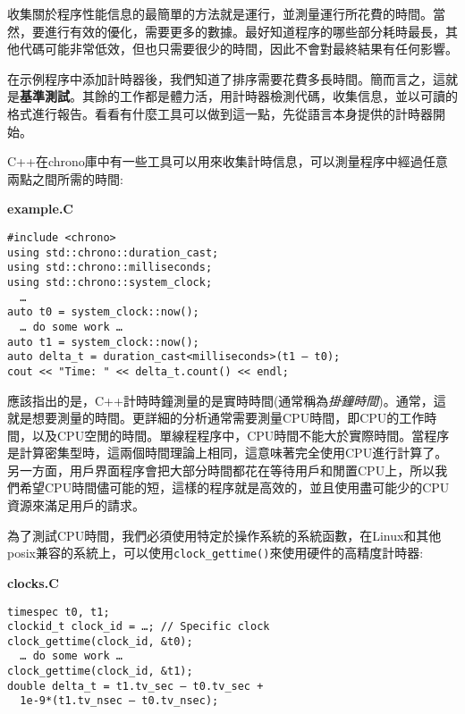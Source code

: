 
收集關於程序性能信息的最簡單的方法就是運行，並測量運行所花費的時間。當然，要進行有效的優化，需要更多的數據。最好知道程序的哪些部分耗時最長，其他代碼可能非常低效，但也只需要很少的時間，因此不會對最終結果有任何影響。

在示例程序中添加計時器後，我們知道了排序需要花費多長時間。簡而言之，這就是\textbf{基準測試}。其餘的工作都是體力活，用計時器檢測代碼，收集信息，並以可讀的格式進行報告。看看有什麼工具可以做到這一點，先從語言本身提供的計時器開始。


C++在chrono庫中有一些工具可以用來收集計時信息，可以測量程序中經過任意兩點之間所需的時間:

\noindent
\textbf{example.C}
\begin{lstlisting}[style=styleCXX]
#include <chrono>
using std::chrono::duration_cast;
using std::chrono::milliseconds;
using std::chrono::system_clock;
  …
auto t0 = system_clock::now();
  … do some work …
auto t1 = system_clock::now();
auto delta_t = duration_cast<milliseconds>(t1 – t0);
cout << "Time: " << delta_t.count() << endl;
\end{lstlisting}

應該指出的是，C++計時時鐘測量的是實時時間(通常稱為\textit{掛鐘時間})。通常，這就是想要測量的時間。更詳細的分析通常需要測量CPU時間，即CPU的工作時間，以及CPU空閒的時間。單線程程序中，CPU時間不能大於實際時間。當程序是計算密集型時，這兩個時間理論上相同，這意味著完全使用CPU進行計算了。另一方面，用戶界面程序會把大部分時間都花在等待用戶和閒置CPU上，所以我們希望CPU時間儘可能的短，這樣的程序就是高效的，並且使用盡可能少的CPU資源來滿足用戶的請求。



為了測試CPU時間，我們必須使用特定於操作系統的系統函數，在Linux和其他posix兼容的系統上，可以使用\texttt{clock\_gettime()}來使用硬件的高精度計時器:

\noindent
\textbf{clocks.C}
\begin{lstlisting}[style=styleCXX]
timespec t0, t1;
clockid_t clock_id = …; // Specific clock
clock_gettime(clock_id, &t0);
  … do some work …
clock_gettime(clock_id, &t1);
double delta_t = t1.tv_sec – t0.tv_sec +
  1e-9*(t1.tv_nsec – t0.tv_nsec);
\end{lstlisting}

